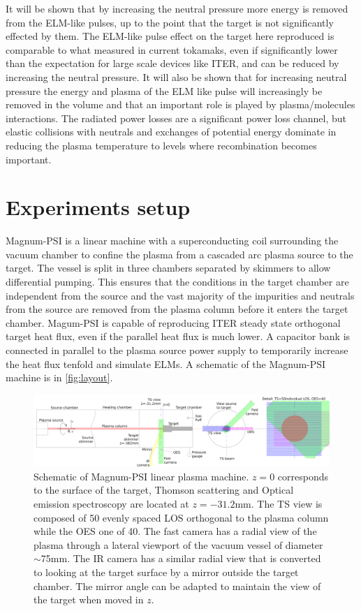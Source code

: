 It will be shown that by increasing the neutral pressure more energy is removed from the ELM-like pulses, up to the point that the target is not significantly effected by them. The ELM-like pulse effect on the target here reproduced is comparable to what measured in current tokamaks, even if significantly lower than the expectation for large scale devices like ITER, and can be reduced by increasing the neutral pressure.
It will also be shown that for increasing neutral pressure the energy and plasma of the ELM like pulse will increasingly be removed in the volume and that an important role is played by plasma/molecules interactions. The radiated power losses are a significant power loss channel, but elastic collisions with neutrals and exchanges of potential energy dominate in reducing the plasma temperature to levels where recombination becomes important.

\section{Experiments setup}\label{Experiments setup}

Magnum-PSI is a linear machine with a superconducting coil surrounding the vacuum chamber to confine the plasma from a cascaded arc plasma source to the target. The vessel is split in three chambers separated by skimmers to allow differential pumping. This ensures that the conditions in the target chamber are independent from the source and the vast majority of the impurities and neutrals from the source are removed from the plasma column before it enters the target chamber. \cite{Scholten2013} Magum-PSI is capable of reproducing ITER steady state orthogonal target heat flux, even if the parallel heat flux is much lower. \cite{Scholten2013} A capacitor bank is connected in parallel to the plasma source power supply to temporarily increase the heat flux tenfold and simulate ELMs. \cite{Morgan2014} A schematic of the Magnum-PSI machine is in \autoref{fig:layout}.

\begin{figure}[!ht]
	\centering
	\includegraphics[width=\linewidth,trim={30 0 0 0},clip]{Chapters/chapter3/figs/layout_5.png}
	\caption{Schematic of Magnum-PSI linear plasma machine. $z=0$ corresponds to the surface of the target, Thomson scattering and Optical emission spectroscopy are located at $z=-31.2$mm. The TS view is composed of 50 evenly spaced LOS orthogonal to the plasma column while the OES one of 40. The fast camera has a radial view of the plasma through a lateral viewport of the vacuum vessel of diameter $\sim$75mm. The IR camera has a similar radial view that is converted to looking at the target surface by a mirror outside the target chamber. The mirror angle can be adapted to maintain the view of the target when moved in $z$.}
	\label{fig:layout}
\end{figure}


